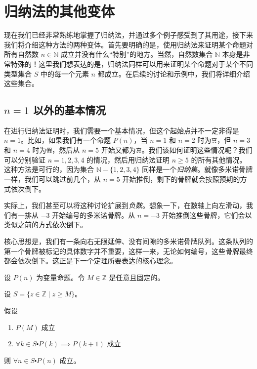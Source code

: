 \section{归纳法的其他变体}

现在我们已经非常熟练地掌握了归纳法，并通过多个例子感受到了其用途，接下来我们将介绍这种方法的两种变体。首先要明确的是，使用归纳法来证明某个命题对所有自然数 $n \in \mathbb{N}$ 成立并没有什么``特别''的地方。当然，自然数集合 $\mathbb{N}$ 本身是非常特殊的！这里我们想表达的是，归纳法同样可以用来证明某个命题对于某个不同类型集合 $S$ 中的每一个元素 $n$ 都成立。在后续的讨论和示例中，我们将详细介绍这些集合。

\subsection{$n = 1$ 以外的基本情况}\label{sec:section5.3.1}

在进行归纳法证明时，我们需要一个基本情况，但这个起始点并不一定非得是 $n = 1$。比如，如果我们有一个命题 $P(n)$，当 $n = 1$ 和 $n = 2$ 时为\verb|真|，但 $n = 3$ 和 $n = 4$ 时为\verb|假|，然后从 $n = 5$ 开始又都为\verb|真|。我们该如何证明这些情况呢？我们可以分别验证 $n = 1,2,3,4$ 的情况，然后用归纳法证明 $n \ge 5$ 的所有其他情况。这种方法是可行的，因为集合 $\mathbb{N} - \{1, 2, 3, 4\}$ 同样是一个\emph{归纳集}。就像多米诺骨牌一样，我们可以跳过前几个，从 $n = 5$ 开始推倒，剩下的骨牌就会按照预期的方式依次倒下。

实际上，我们甚至可以将这种讨论扩展到\emph{负数}。想象一下，在数轴上向左滑动，我们有一排从 $-3$ 开始编号的多米诺骨牌。从 $n = -3$ 开始推倒这些骨牌，它们会以类似之前的方式依次倒下。

核心思想是，我们有一条向右无限延伸、没有间隙的多米诺骨牌队列。这条队列的第一个骨牌被标记的具体数字并不重要，这样一来，无论如何编号，这些骨牌最终都会依次倒下。这正是下一个定理所要表达的核心理念。

\begin{theorem}[任意基本情况的归纳]\label{theorem5.3.1}
    设 $P(n)$ 为变量命题。令 $M \in \mathbb{Z}$ 是任意且固定的。

    设 $S = \{z \in \mathbb{Z} \mid z \ge M\}$。

    假设
    \begin{enumerate}[label=(\arabic*)]
        \item $P(M)$ 成立
        \item $\forall k \in S \centerdot P(k) \implies P(k + 1)$ 成立
    \end{enumerate}

    则 $\forall n \in S \centerdot P(n)$ 成立。
\end{theorem}

